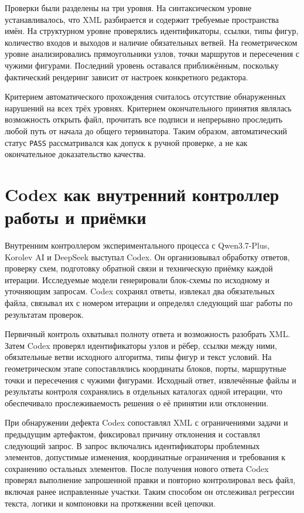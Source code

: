 \documentclass[a4paper,12pt]{extreport}
\newcommand{\code}[1]{\texttt{#1}}
\begin{document}
Проверки были разделены на три уровня. На синтаксическом уровне устанавливалось, что XML разбирается и содержит требуемые пространства имён. На структурном уровне проверялись идентификаторы, ссылки, типы фигур, количество входов и выходов и наличие обязательных ветвей. На геометрическом уровне анализировались прямоугольники узлов, точки маршрутов и пересечения с чужими фигурами. Последний уровень оставался приближённым, поскольку фактический рендеринг зависит от настроек конкретного редактора.

Критерием автоматического прохождения считалось отсутствие обнаруженных нарушений на всех трёх уровнях. Критерием окончательного принятия являлась возможность открыть файл, прочитать все подписи и непрерывно проследить любой путь от начала до общего терминатора. Таким образом, автоматический статус \code{PASS} рассматривался как допуск к ручной проверке, а не как окончательное доказательство качества.

\section{Codex как внутренний контроллер работы и приёмки}

Внутренним контроллером экспериментального процесса с Qwen3.7-Plus, Korolev AI и DeepSeek выступал Codex. Он организовывал обработку ответов, проверку схем, подготовку обратной связи и техническую приёмку каждой итерации. Исследуемые модели генерировали блок-схемы по исходному и уточняющим запросам. Codex сохранял ответы, извлекал два обязательных файла, связывал их с номером итерации и определял следующий шаг работы по результатам проверок.

Первичный контроль охватывал полноту ответа и возможность разобрать XML. Затем Codex проверял идентификаторы узлов и рёбер, ссылки между ними, обязательные ветви исходного алгоритма, типы фигур и текст условий. На геометрическом этапе сопоставлялись координаты блоков, порты, маршрутные точки и пересечения с чужими фигурами. Исходный ответ, извлечённые файлы и результаты контроля сохранялись в отдельных каталогах одной итерации, что обеспечивало прослеживаемость решения о её принятии или отклонении.

При обнаружении дефекта Codex сопоставлял XML с ограничениями задачи и предыдущим артефактом, фиксировал причину отклонения и составлял следующий запрос. В запрос включались идентификаторы проблемных элементов, допустимые изменения, координатные ограничения и требования к сохранению остальных элементов. После получения нового ответа Codex проверял выполнение запрошенной правки и повторно контролировал весь файл, включая ранее исправленные участки. Таким способом он отслеживал регрессии текста, логики и компоновки на протяжении всей цепочки.
\end{document}
